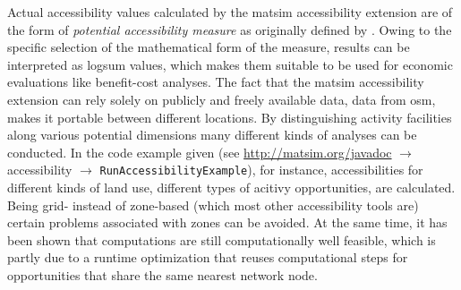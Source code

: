 Actual accessibility values calculated by the \gls{matsim} accessibility extension are of the form of 
\emph{potential accessibility measure} as originally defined by \citet{Hansen1959HowAccessibilityShapesLandUse}.
Owing to the specific selection of the mathematical form of the measure, results can be interpreted as 
\gls{logsum} values, which makes them suitable to be used for economic evaluations like benefit-cost analyses.
The fact that the \gls{matsim} accessibility extension can rely solely on publicly and freely available 
data, \eg data from \gls{osm}, makes it portable between different locations. By distinguishing activity facilities 
along various potential dimensions many different kinds of analyses can be conducted. In the code example given
(see \url{http://matsim.org/javadoc} $\to$ accessibility $\to$ \lstinline{RunAccessibilityExample}), for instance,
accessibilities for different kinds of land use, \ie different types of acitivy opportunities, are calculated.
Being grid- instead of zone-based (which most other accessibility tools are) certain problems associated with 
zones can be avoided. At the same time, it has been shown that computations are still computationally well
feasible, which is partly due to a runtime optimization that reuses computational steps for opportunities that 
share the same nearest network node.






%
%




